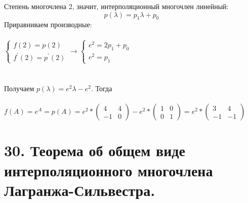 \documentclass[14pt]{extarticle}
\begin{document}
  Степень многочлена 2, значит, интерполяционный многочлен линейный:
  $$ p(\lambda) = p_1\lambda + p_0 $$
  Приравниваем производные: \\\\
  $\begin{cases}
    f(2) = p(2)\\
    f^{'}(2) = p^{'}(2)
  \end{cases} \rightarrow 
  \begin{cases}
    e^2 = 2p_1 + p_0\\
    e^2 = p_1
  \end{cases}$\\\\\\
  Получаем $ p(\lambda) = e^2\lambda - e^2 $. Тогда \\\\
  $f(A) = e^A = p(A) = e^2 * \begin{pmatrix}
    4 & 4\\ 
    -1 & 0
  \end{pmatrix} - e^2 * \begin{pmatrix}
    1 & 0\\ 
    0 & 1
  \end{pmatrix} = e^2 * \begin{pmatrix}
    3 & 4\\ 
    -1 & -1
  \end{pmatrix}$

\section{30.	
    Теорема об общем виде интерполяционного многочлена Лагранжа-Сильвестра.
}
\end{document}
